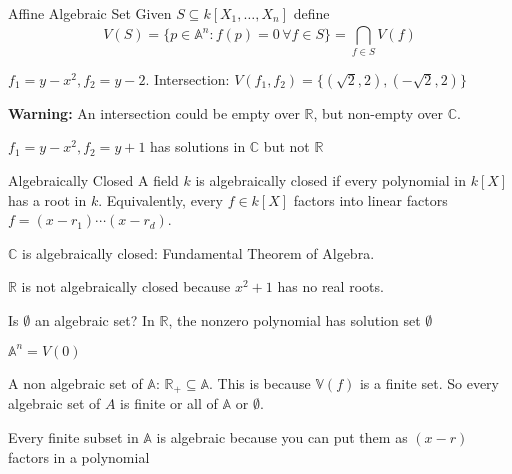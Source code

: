 \documentclass{report}
\begin{document}
\begin{definition}{Affine Algebraic Set}
    Given $S \subseteq  k[X_{1}, \ldots, X_{n}]$ define
        \begin{equation*}
            V(S) = \{p \in \mathbb{A}^{n} : f(p) = 0 \, \forall f \in S\} = \bigcap_{f \in S}^{} V(f)
        \end{equation*}
\end{definition}

\begin{examples}
    \begin{example}
        $f_{1} = y - x^{2}, f_{2} = y - 2$. Intersection: $V(f_{1}, f_{2}) = \{(\sqrt{2}, 2), (-\sqrt{2}, 2)\}$
    \end{example}
\end{examples}

\textbf{Warning:} An intersection could be empty over $\mathbb{R}$, but non-empty over $\mathbb{C}$.

\begin{examples}
    \begin{example}
        $f_{1} = y - x^{2}, f_{2} = y + 1$ has solutions in $\mathbb{C}$ but not $\mathbb{R}$
    \end{example}
\end{examples}

\begin{definition}{Algebraically Closed}
    A field $k$ is algebraically closed if every polynomial in $k[X]$ has a root in $k$. Equivalently, every $f \in k[X]$ factors into linear factors $f = (x - r_{1}) \cdots (x - r_{d})$.
\end{definition}

\begin{examples}
    \begin{example}
        $\mathbb{C}$ is algebraically closed: Fundamental Theorem of Algebra.
    \end{example}
    \begin{example}
        $\mathbb{R}$ is not algebraically closed because $x^{2} + 1$ has no real roots.
    \end{example}
\end{examples}

\begin{examples}
    \begin{example}
        Is $\emptyset$ an algebraic set? In $\mathbb{R}$, the nonzero polynomial has solution set $\emptyset$
    \end{example}
    \begin{example}
        $\mathbb{A}^{n} = V(0)$
    \end{example}
    \begin{example}
        A non algebraic set of $\mathbb{A}$: $\mathbb{R}_{+} \subseteq \mathbb{A}$. This is because $\mathbb{V}(f)$ is a finite set. So every algebraic set of $A$ is finite or all of $\mathbb{A}$ or $\emptyset$.
    \end{example}
    \begin{example}
        Every finite subset in $\mathbb{A}$ is algebraic because you can put them as $(x - r)$ factors in a polynomial
    \end{example}
\end{examples}
\end{document}
